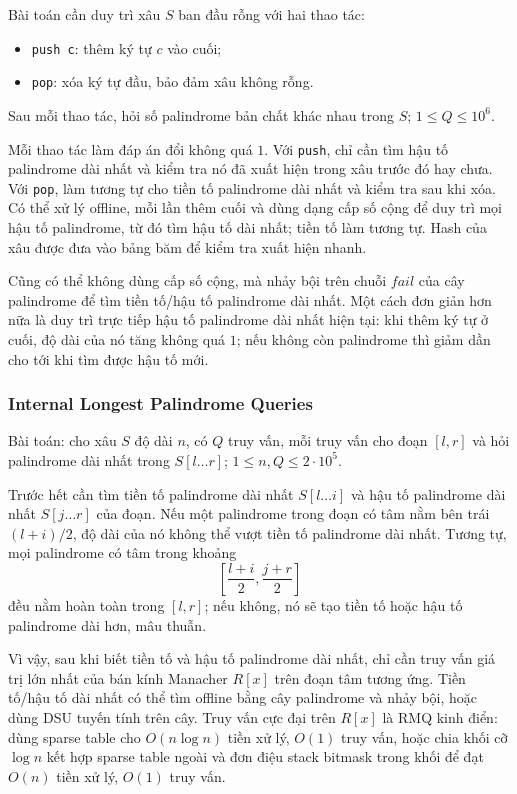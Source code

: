 \documentclass[11pt]{article}
\begin{document}
Bài toán cần duy trì xâu $S$ ban đầu rỗng với hai thao tác:
\begin{itemize}
  \item \texttt{push c}: thêm ký tự $c$ vào cuối;
  \item \texttt{pop}: xóa ký tự đầu, bảo đảm xâu không rỗng.
\end{itemize}
Sau mỗi thao tác, hỏi số palindrome bản chất khác nhau trong $S$; $1\le Q\le
10^6$.

Mỗi thao tác làm đáp án đổi không quá $1$. Với \texttt{push}, chỉ cần tìm hậu
tố palindrome dài nhất và kiểm tra nó đã xuất hiện trong xâu trước đó hay chưa.
Với \texttt{pop}, làm tương tự cho tiền tố palindrome dài nhất và kiểm tra sau
khi xóa. Có thể xử lý offline, mỗi lần thêm cuối và dùng dạng cấp số cộng để
duy trì mọi hậu tố palindrome, từ đó tìm hậu tố dài nhất; tiền tố làm tương tự.
Hash của xâu được đưa vào bảng băm để kiểm tra xuất hiện nhanh.

Cũng có thể không dùng cấp số cộng, mà nhảy bội trên chuỗi $\mathit{fail}$ của
cây palindrome để tìm tiền tố/hậu tố palindrome dài nhất. Một cách đơn giản hơn
nữa là duy trì trực tiếp hậu tố palindrome dài nhất hiện tại: khi thêm ký tự ở
cuối, độ dài của nó tăng không quá $1$; nếu không còn palindrome thì giảm dần
cho tới khi tìm được hậu tố mới.

\subsubsection{Internal Longest Palindrome Queries}

Bài toán: cho xâu $S$ độ dài $n$, có $Q$ truy vấn, mỗi truy vấn cho đoạn
$[l,r]$ và hỏi palindrome dài nhất trong $S[l\ldots r]$; $1\le n,Q\le
2\cdot 10^5$.

Trước hết cần tìm tiền tố palindrome dài nhất $S[l\ldots i]$ và hậu tố
palindrome dài nhất $S[j\ldots r]$ của đoạn. Nếu một palindrome trong đoạn có
tâm nằm bên trái $(l+i)/2$, độ dài của nó không thể vượt tiền tố palindrome dài
nhất. Tương tự, mọi palindrome có tâm trong khoảng
\[
  \left[\frac{l+i}{2},\frac{j+r}{2}\right]
\]
đều nằm hoàn toàn trong $[l,r]$; nếu không, nó sẽ tạo tiền tố hoặc hậu tố
palindrome dài hơn, mâu thuẫn.

Vì vậy, sau khi biết tiền tố và hậu tố palindrome dài nhất, chỉ cần truy vấn giá
trị lớn nhất của bán kính Manacher $R[x]$ trên đoạn tâm tương ứng. Tiền tố/hậu
tố dài nhất có thể tìm offline bằng cây palindrome và nhảy bội, hoặc dùng DSU
tuyến tính trên cây. Truy vấn cực đại trên $R[x]$ là RMQ kinh điển: dùng sparse
table cho $O(n\log n)$ tiền xử lý, $O(1)$ truy vấn, hoặc chia khối cỡ $\log n$
kết hợp sparse table ngoài và đơn điệu stack bitmask trong khối để đạt $O(n)$
tiền xử lý, $O(1)$ truy vấn.
\end{document}

